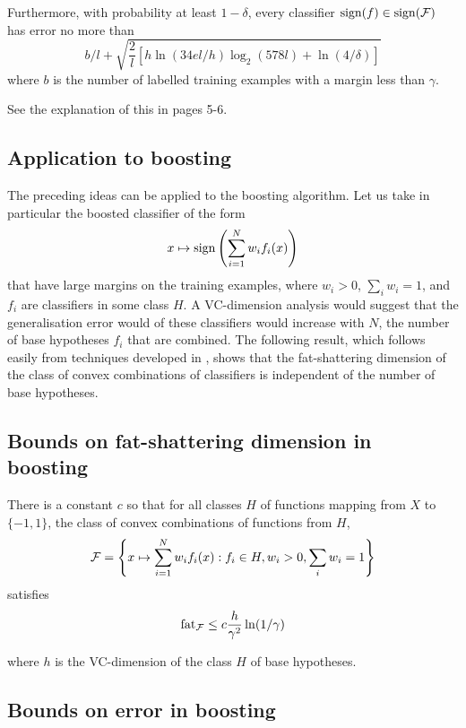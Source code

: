 Furthermore, with probability at least $1 - \delta$, every classifier
$\mathrm{sign} (f) \in \mathrm{sign} (\mathcal{F})$ has error no more than
\begin{equation}
b/l + \sqrt{\frac{2}{l} \left[ h \ln(34el/h) \log_2(578l) +
\ln(4/\delta) \right] }
\end{equation}
where $b$ is the number of labelled training examples with a margin
less than $\gamma$.

See the explanation of this in \cite{Bartlett98a} pages 5-6.

\subsection{Application to boosting}
The preceding ideas can be applied to the boosting algorithm.  Let us
take in particular the boosted classifier of the form
\begin{equation}
x \mapsto \mathrm{sign} \left( \sum_{i=1}^{N} w_i f_i(x) \right)
\end{equation}
that have large margins on the training examples, where $w_i > 0$,
$\sum_i w_i = 1$, and $f_i$ are classifiers in some class $H$.  A
VC-dimension analysis would suggest that the generalisation error
would of these classifiers would increase with $N$, the number of base
hypotheses $f_i$ that are combined.  The following result, which
follows easily from techniques developed in \cite{Bartlett98}, shows
that the fat-shattering dimension of the class of convex combinations
of classifiers is independent of the number of base hypotheses.

\subsection{Bounds on fat-shattering dimension in boosting}

There is a constant $c$ so that for all classes $H$ of functions
mapping from $X$ to $\{-1, 1\}$, the class of convex combinations of
functions from $H$,
\begin{equation}
\mathcal{F} = \left\{
	x \mapsto \sum_{i=1}^N w_i f_i(x) : f_i \in H, w_i > 0, \sum_i
	w_i = 1
\right\}
\end{equation}
satisfies
\begin{equation}
\mathrm{fat}_{\mathcal{F}} \leq c \frac{h}{\gamma^2} \ln (1/\gamma)
\end{equation}

where $h$ is the VC-dimension of the class $H$ of base hypotheses.

\subsection{Bounds on error in boosting}

